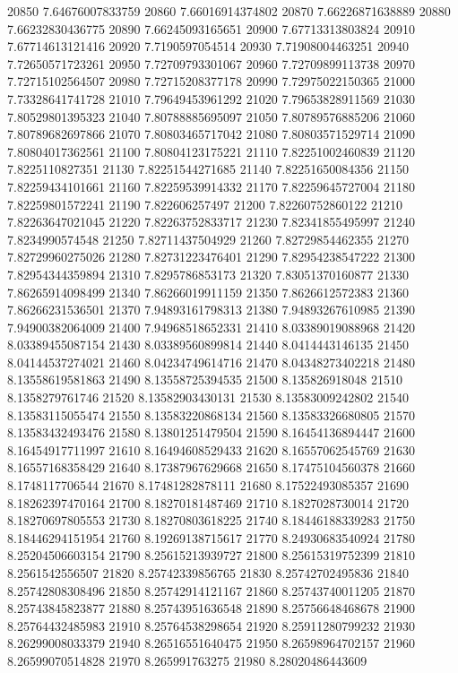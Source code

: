 {20850 7.64676007833759
20860 7.66016914374802
20870 7.66226871638889
20880 7.66232830436775
20890 7.66245093165651
20900 7.67713313803824
20910 7.67714613121416
20920 7.7190597054514
20930 7.71908004463251
20940 7.72650571723261
20950 7.72709793301067
20960 7.72709899113738
20970 7.72715102564507
20980 7.72715208377178
20990 7.72975022150365
21000 7.73328641741728
21010 7.79649453961292
21020 7.79653828911569
21030 7.80529801395323
21040 7.80788885695097
21050 7.80789576885206
21060 7.80789682697866
21070 7.80803465717042
21080 7.80803571529714
21090 7.80804017362561
21100 7.80804123175221
21110 7.82251002460839
21120 7.8225110827351
21130 7.82251544271685
21140 7.82251650084356
21150 7.82259434101661
21160 7.82259539914332
21170 7.82259645727004
21180 7.82259801572241
21190 7.822606257497
21200 7.82260752860122
21210 7.82263647021045
21220 7.82263752833717
21230 7.82341855495997
21240 7.8234990574548
21250 7.82711437504929
21260 7.82729854462355
21270 7.82729960275026
21280 7.82731223476401
21290 7.82954238547222
21300 7.82954344359894
21310 7.8295786853173
21320 7.83051370160877
21330 7.86265914098499
21340 7.86266019911159
21350 7.8626612572383
21360 7.86266231536501
21370 7.94893161798313
21380 7.94893267610985
21390 7.94900382064009
21400 7.94968518652331
21410 8.03389019088968
21420 8.03389455087154
21430 8.03389560899814
21440 8.0414443146135
21450 8.04144537274021
21460 8.04234749614716
21470 8.04348273402218
21480 8.13558619581863
21490 8.13558725394535
21500 8.135826918048
21510 8.1358279761746
21520 8.13582903430131
21530 8.13583009242802
21540 8.13583115055474
21550 8.13583220868134
21560 8.13583326680805
21570 8.13583432493476
21580 8.13801251479504
21590 8.16454136894447
21600 8.16454917711997
21610 8.16494608529433
21620 8.16557062545769
21630 8.16557168358429
21640 8.17387967629668
21650 8.17475104560378
21660 8.1748117706544
21670 8.17481282878111
21680 8.17522493085357
21690 8.18262397470164
21700 8.18270181487469
21710 8.1827028730014
21720 8.18270697805553
21730 8.18270803618225
21740 8.18446188339283
21750 8.18446294151954
21760 8.19269138715617
21770 8.24930683540924
21780 8.25204506603154
21790 8.25615213939727
21800 8.25615319752399
21810 8.2561542556507
21820 8.25742339856765
21830 8.25742702495836
21840 8.25742808308496
21850 8.25742914121167
21860 8.25743740011205
21870 8.25743845823877
21880 8.25743951636548
21890 8.25756648468678
21900 8.25764432485983
21910 8.25764538298654
21920 8.25911280799232
21930 8.26299008033379
21940 8.26516551640475
21950 8.26598964702157
21960 8.26599070514828
21970 8.265991763275
21980 8.28020486443609
}
